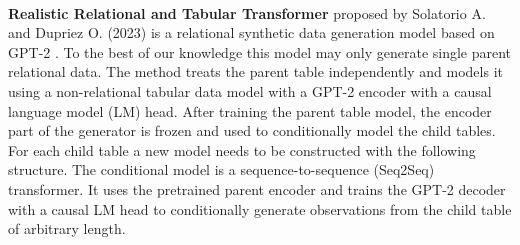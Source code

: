 \documentclass[fleqn,moreauthors,10pt]{ds_report}
\begin{document}
\\

\textbf{Realistic Relational and Tabular Transformer} proposed by Solatorio A. and Dupriez O. (2023) is a relational synthetic data generation model based on GPT-2 . To the best of our knowledge this model may only generate single parent relational data. The method treats the parent table independently and models it using a non-relational tabular data model with a GPT-2 encoder with a causal language model (LM) head. After training the parent table model, the encoder part of the generator is frozen and used to conditionally model the child tables. For each child table a new model needs to be constructed with the following structure. The conditional model is a sequence-to-sequence (Seq2Seq) transformer.
It uses the pretrained parent encoder and trains the GPT-2 decoder with a causal LM head to conditionally generate observations from the child table of arbitrary length.

\end{document}
